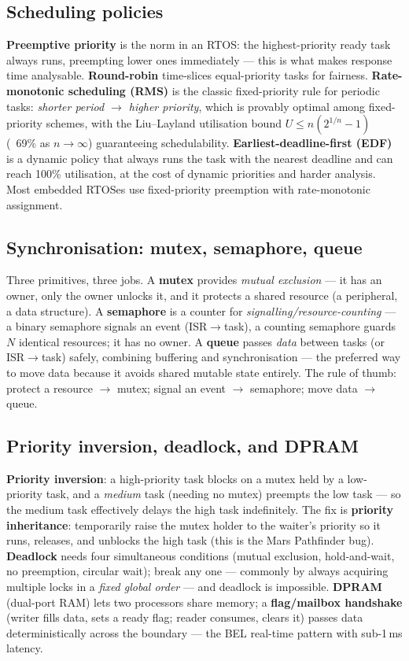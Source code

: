 \subsection{Scheduling policies}

\textbf{Preemptive priority} is the norm in an RTOS: the highest-priority ready
task always runs, preempting lower ones immediately --- this is what makes
response time analysable. \textbf{Round-robin} time-slices equal-priority tasks
for fairness. \textbf{Rate-monotonic scheduling (RMS)} is the classic
fixed-priority rule for periodic tasks: \emph{shorter period $\rightarrow$
higher priority}, which is provably optimal among fixed-priority schemes, with
the Liu--Layland utilisation bound $U \le n(2^{1/n}-1)$ (~69\% as $n\to\infty$)
guaranteeing schedulability. \textbf{Earliest-deadline-first (EDF)} is a dynamic
policy that always runs the task with the nearest deadline and can reach 100\%
utilisation, at the cost of dynamic priorities and harder analysis. Most
embedded RTOSes use fixed-priority preemption with rate-monotonic assignment.

\subsection{Synchronisation: mutex, semaphore, queue}

Three primitives, three jobs. A \textbf{mutex} provides \emph{mutual exclusion}
--- it has an owner, only the owner unlocks it, and it protects a shared
resource (a peripheral, a data structure). A \textbf{semaphore} is a counter for
\emph{signalling/resource-counting} --- a binary semaphore signals an event
(ISR$\rightarrow$task), a counting semaphore guards $N$ identical resources;
it has no owner. A \textbf{queue} passes \emph{data} between tasks (or
ISR$\rightarrow$task) safely, combining buffering and synchronisation --- the
preferred way to move data because it avoids shared mutable state entirely. The
rule of thumb: protect a resource $\rightarrow$ mutex; signal an event
$\rightarrow$ semaphore; move data $\rightarrow$ queue.

\subsection{Priority inversion, deadlock, and DPRAM}

\textbf{Priority inversion}: a high-priority task blocks on a mutex held by a
low-priority task, and a \emph{medium} task (needing no mutex) preempts the low
task --- so the medium task effectively delays the high task indefinitely. The
fix is \textbf{priority inheritance}: temporarily raise the mutex holder to the
waiter's priority so it runs, releases, and unblocks the high task (this is the
Mars Pathfinder bug). \textbf{Deadlock} needs four simultaneous conditions
(mutual exclusion, hold-and-wait, no preemption, circular wait); break any one
--- commonly by always acquiring multiple locks in a \emph{fixed global order}
--- and deadlock is impossible. \textbf{DPRAM} (dual-port RAM) lets two
processors share memory; a \textbf{flag/mailbox handshake} (writer fills data,
sets a ready flag; reader consumes, clears it) passes data deterministically
across the boundary --- the BEL real-time pattern with sub-1\,ms latency.

